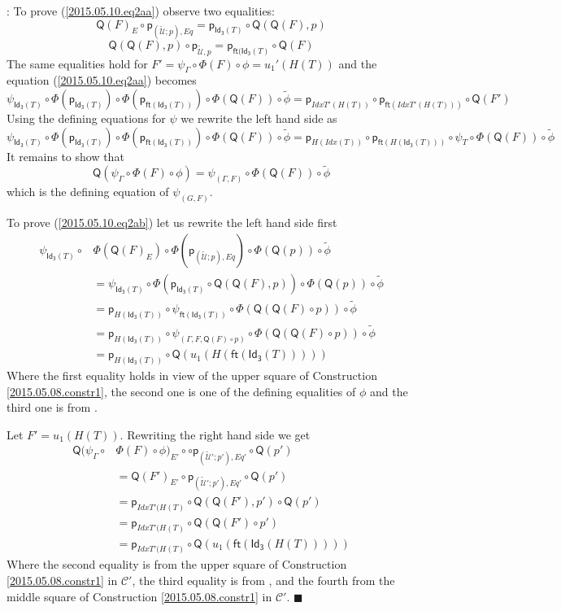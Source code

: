 \documentclass[12pt]{article}
\numberwithin{equation}{section}
\newenvironment{myproof}{{\bf Proof}:}{$\blacksquare$ \vskip 5mm }
\newcommand{\wt}{\widetilde}
\newcommand{\C}{{\mathcal C}}  %
\newcommand{\ft}{\mathsf{ft}}
\newcommand{\p}{\mathsf{p}}
\newcommand{\Idx}{\mathsf{Id_3}} %
\newcommand{\U}{\mathcal{U}}
\newcommand{\Q}{\mathsf{Q}}
\begin{document}
\begin{myproof}
To prove (\ref{2015.05.10.eq2aa}) observe two equalities:
%
$$\Q(F)_E\circ \p_{(\wt{\U};p),Eq}=\p_{\Idx(T)}\circ \Q(\Q(F),p)$$
%
$$\Q(\Q(F),p)\circ \p_{\wt{\U},p}=\p_{\ft(\Idx(T)}\circ \Q(F)$$
%
The same equalities hold for $F'=\psi_{\Gamma}\circ\Phi(F)\circ
\phi=u_1'(H(T))$ and the equation (\ref{2015.05.10.eq2aa}) becomes
%
$$\psi_{\Idx(T)}\circ \Phi(\p_{\Idx(T)})\circ \Phi(\p_{\ft(\Idx(T))})\circ
\Phi(\Q(F))\circ \wt{\phi}=\p_{IdxT'(H(T))}\circ \p_{\ft(IdxT'(H(T)))}\circ \Q(F')$$
%
Using the defining equations for $\psi$ we rewrite the left hand side as
%
$$\psi_{\Idx(T)}\circ \Phi(\p_{\Idx(T)})\circ \Phi(\p_{\ft(\Idx(T))})\circ
\Phi(\Q(F))\circ \wt{\phi}=\p_{H(Idx(T))}\circ \p_{\ft(H(\Idx(T)))}\circ
\psi_{T}\circ \Phi(\Q(F))\circ \wt{\phi}$$
%
It remains to show that
%
$$\Q(\psi_{\Gamma}\circ \Phi(F)\circ \phi)=\psi_{(\Gamma,F)}\circ
\Phi(\Q(F))\circ \wt{\phi}$$
%
which is the defining equation of $\psi_{(G,F)}$.

To prove (\ref{2015.05.10.eq2ab}) let us rewrite the left hand side first
%
\begin{align*}
  \psi_{\Idx(T)}\circ & \Phi(\Q(F)_E)\circ \Phi(\p_{(\wt{\U};p),Eq})\circ \Phi(\Q(p))\circ \wt{\phi} \\
    & = \psi_{\Idx(T)}\circ \Phi(\p_{\Idx(T)}\circ \Q(\Q(F),p))\circ \Phi(\Q(p))\circ\wt{\phi} \\
    & = \p_{H(\Idx(T))}\circ \psi_{\ft(\Idx(T))}\circ \Phi(\Q(\Q(F)\circ p))\circ \wt{\phi} \\
    & = \p_{H(\Idx(T))}\circ \psi_{(\Gamma,F,\Q(F)\circ p)}\circ \Phi(\Q(\Q(F)\circ p))\circ \wt{\phi} \\
    & = \p_{H(\Idx(T))}\circ   \Q(u_1(H(\ft(\Idx(T)))))
\end{align*}
%
Where the first equality holds in view of the upper square of Construction
\ref{2015.05.08.constr1}, the second one is one of the defining equalities of
$\phi$ and the third one is from \cite[Lemma 3.2]{fromunivwithPi}.

Let $F'=u_1(H(T))$. Rewriting the right hand side we get
%
\begin{align*}
  \Q(\psi_{\Gamma}\circ & \Phi(F)\circ \phi)_{E'}\circ \circ \p_{(\wt{\U}';p'),Eq'}\circ \Q(p') \\
    & = \Q(F')_{E'}\circ \p_{(\wt{\U}';p'),Eq'}\circ \Q(p') \\
    & = \p_{IdxT'(H(T)}\circ \Q(\Q(F'),p')\circ \Q(p') \\
    & = \p_{IdxT'(H(T)}\circ \Q(\Q(F')\circ p') \\
    & = \p_{IdxT'(H(T)}\circ \Q(u_1(\ft(\Idx(H(T)))))
\end{align*}
%
Where the second equality is from the upper square of Construction
\ref{2015.05.08.constr1} in $\C'$, the third equality is from
\cite[Lemma 3.2]{fromunivwithPi}, and the fourth from the middle square of
Construction \ref{2015.05.08.constr1} in $\C'$.
\end{myproof}
\end{document}
